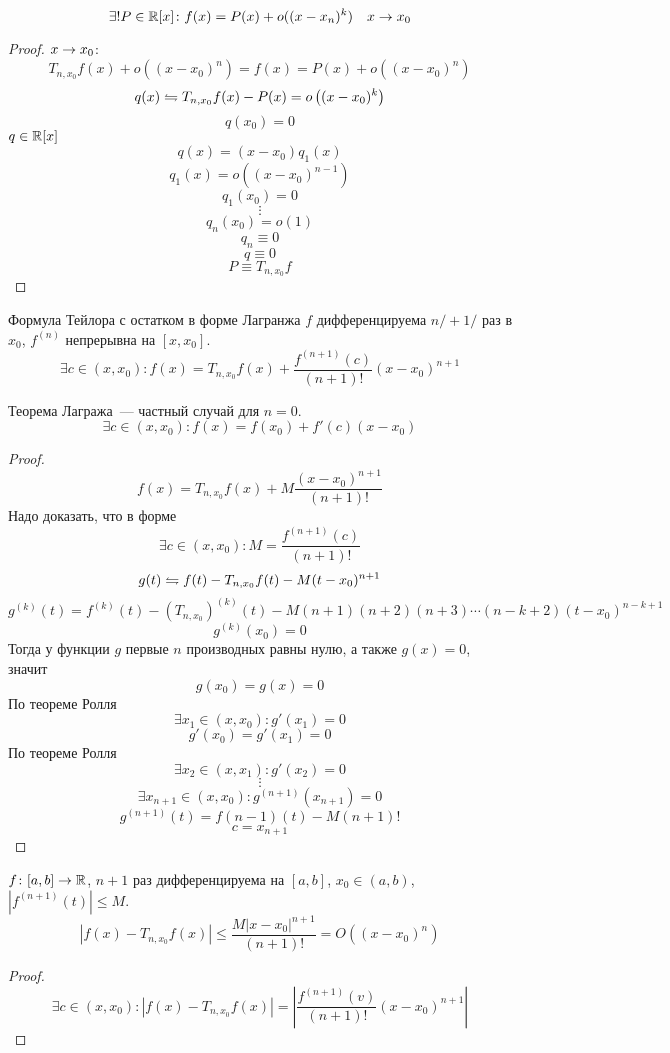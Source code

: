 \begin{conseq}
$$\exists! P \in \mathbb{R}[x]\colon f(x) = P(x) + o((x - x_n)^k) \quad x \rightarrow x_0$$
\end{conseq}
\begin{proof}
$x \rightarrow x_0$:
$$T_{n, x_0} f(x) + o\left((x-x_0)^n\right) = f(x) = P(x) + o\left((x-x_0)^n\right)$$
$$q(x) \leftrightharpoons T_{n, x_0} f(x) - P(x) = o\left((x-x_0)^k\right)$$
$$q(x_0) = 0$$
$q \in \mathbb{R}[x]$
$$q(x) = (x - x_0) q_1(x)$$
$$q_1(x) = o\left((x - x_0)^{n-1}\right)$$
$$q_1(x_0) = 0$$
$$\vdots$$
$$q_n(x_0) = o(1)$$
$$q_n \equiv 0$$
$$q \equiv 0$$
$$P \equiv T_{n, x_0} f$$
\end{proof}

\begin{theorem}{Формула Тейлора с остатком в форме Лагранжа}
$f$ дифференцируема $n/ + 1/$ раз в $x_0$, $f^{(n)}$ непрерывна на $[x, x_0]$.
$$\exists c \in (x, x_0)\colon f(x) = T_{n, x_0} f(x) + \frac{f^{(n+1)}(c)}{(n+1)!} (x-x_0)^{n+1}$$
\end{theorem}
\begin{Rem}
Теорема Лагража~--- частный случай для $n = 0$.
$$\exists c\in(x,x_0)\colon f(x) = f(x_0) + f'(c)(x-x_0)$$
\end{Rem}
\begin{proof}
$$f(x) = T_{n, x_0} f(x) + M \frac{(x-x_0)^{n+1}}{(n+1)!}$$
Надо доказать, что в форме
$$\exists c\in(x,x_0)\colon M = \frac{f^{(n+1)}(c)}{(n+1)!}$$
$$g(t) \leftrightharpoons f(t) - T_{n, x_0} f(t) - M(t-x_0)^{n+1}$$
$$g^{(k)} (t) = f^{(k)}(t) - (T_{n, x_0})^{(k)} (t) - M(n+1)(n+2)(n+3)\cdots(n-k+2)(t-x_0)^{n-k+1}$$
$$g^{(k)} (x_0) = 0$$
Тогда у функции $g$ первые $n$ производных равны нулю, а также $g(x) = 0$, значит
$$g(x_0) = g(x) = 0$$
По теореме Ролля
$$\exists x_1\in(x, x_0)\colon g'(x_1) = 0$$
$$g'(x_0) = g'(x_1) = 0$$
По теореме Ролля
$$\exists x_2\in(x, x_1)\colon g'(x_2) = 0$$
$$\vdots$$
$$\exists x_{n+1}\in(x, x_0)\colon g^{(n+1)}(x_{n+1}) = 0$$
$$g^{(n+1)}(t) = f{(n-1)}(t) - M(n+1)!$$
$$c = x_{n+1}$$
\end{proof}

\begin{conseq}
$f\colon [a, b] \rightarrow \mathbb{R}$, $n+1$ раз дифференцируема на $[a, b]$, $x_0 \in (a, b)$, $\left|f^{(n+1)} (t)\right| \leqslant M$.
$$\left|f(x) - T_{n, x_0} f(x)\right| \leqslant \frac{M \left|x-x_0\right|^{n+1}}{(n+1)!} = O\left((x-x_0)^n\right)$$
\end{conseq}
\begin{proof}
$$\exists c \in (x,x_0)\colon \left|f(x) - T_{n, x_0} f(x)\right| = \left|\frac{f^{(n+1)}(v)}{(n+1)!}(x-x_0)^{n+1}\right|$$
\end{proof}

